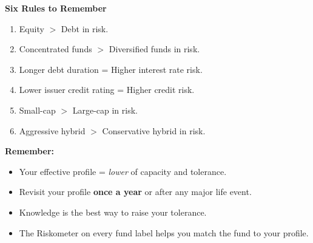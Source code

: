 \documentclass[12pt,a4paper]{article}
\begin{document}
\begin{cheatsheet}
\bigskip
\textbf{\color{PrimaryBlue}\large Six Rules to Remember}

\begin{enumerate}[label=\textbf{\arabic*.}, leftmargin=*]
  \item Equity $>$ Debt in risk.
  \item Concentrated funds $>$ Diversified funds in risk.
  \item Longer debt duration = Higher interest rate risk.
  \item Lower issuer credit rating = Higher credit risk.
  \item Small-cap $>$ Large-cap in risk.
  \item Aggressive hybrid $>$ Conservative hybrid in risk.
\end{enumerate}

\bigskip
\textbf{\color{PrimaryBlue}\large Remember:}
\begin{itemize}
  \item Your effective profile = \textit{lower} of capacity and tolerance.
  \item Revisit your profile \textbf{once a year} or after any major life event.
  \item Knowledge is the best way to raise your tolerance.
  \item The Riskometer on every fund label helps you match the fund to your profile.
\end{itemize}

\end{cheatsheet}
\end{document}
